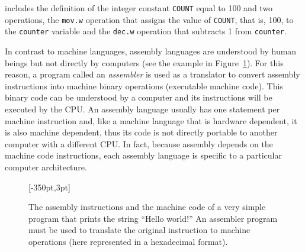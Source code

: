 \medskip
\noindent includes the definition of the integer constant \texttt{COUNT} equal to 100 and two operations, the \texttt{mov.w} operation that assigns the value of \texttt{COUNT}, that is, 100, to the \texttt{counter} variable and the \texttt{dec.w} operation that subtracts 1 from \texttt{counter}.

In contrast to machine languages, assembly languages are understood by human beings but not directly by computers (see the example in Figure~\ref{fig:2.1}). For this reason, a program called an \textit{assembler} is used as a translator to convert assembly instructions into machine binary operations (executable machine code). This binary code can be understood by a computer and its instructions will be executed by the CPU. An assembly language usually has one statement per machine instruction and, like a machine language that is hardware dependent, it is also machine dependent, thus its code is not directly portable to another computer with a different CPU. In fact, because assembly depends on the machine code instructions, each assembly language is specific to a particular computer architecture.

\begin{figure}[!t]\vspace*{3pt}
\hspace*{-56pt}[-350pt,3pt]\vspace*{9pt}
\caption{\label{fig:2.1}The assembly instructions and the machine code of a very simple program that prints the string ``Hello world!'' An assembler program must be used to translate the original instruction to machine operations (here represented in a hexadecimal format).}
\end{figure}

